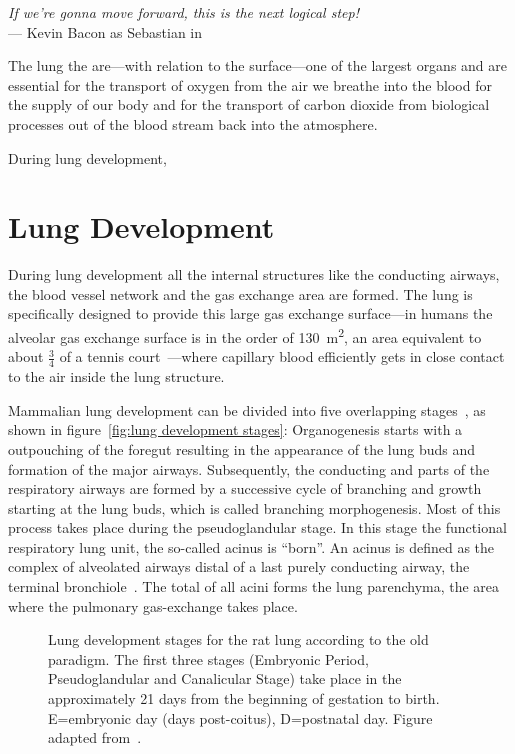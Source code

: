 \label{ch:lung}
\begin{flushright}{\slshape If we're gonna move forward, this is the next logical step!} \\ \medskip
	--- Kevin Bacon as Sebastian in \citep{HollowMan}
\end{flushright}
\vspace{52mm}

The lung the are---with relation to the surface---one of the largest organs  and are essential for the transport of oxygen from the air we breathe into the blood for the supply of our body and for the transport of carbon dioxide from biological processes out of the blood stream back into the atmosphere.

During lung development, 

\section{Lung Development}
During lung development all the internal structures like the conducting airways, the blood vessel network and the gas exchange area are formed. The lung is specifically designed to provide this large gas exchange surface---in humans the alveolar gas exchange surface is in the order of \SI{130}{\meter\squared}, an area equivalent to about $\frac{3}{4}$ of a tennis court~\cite{Weibel2009}---where capillary blood efficiently gets in close contact to the air inside the lung structure. 

Mammalian lung development can be divided into five overlapping stages~\cite{Schittny2004,Schittny2007a}, as shown in figure~\ref{fig:lung development stages}: Organogenesis starts with a outpouching of the foregut resulting in the appearance of the lung buds and formation of the major airways. Subsequently, the conducting and parts of the respiratory airways are formed by a successive cycle of branching and growth starting at the lung buds, which is called branching morphogenesis. Most of this process takes place during the pseudoglandular stage. In this stage the functional respiratory lung unit, the so-called acinus is ``born''. An acinus is defined as the complex of alveolated airways distal of a last purely conducting airway, the terminal bronchiole~\cite{Rodriguez1987}. The total of all acini forms the lung parenchyma, the area where the pulmonary gas-exchange takes place.

\begin{figure}[htb]
	\noindent\makebox[\textwidth]{%
		\centering%
		}%
	\caption[Lung development stages]{Lung development stages for the rat lung according to the old paradigm. The first three stages (Embryonic Period, Pseudoglandular and Canalicular Stage) take place in the approximately 21 days from the beginning of gestation to birth. E=embryonic day (days post-coitus), D=postnatal day. Figure adapted from~\cite{Schittny2007a}.}
	\label{fig:lung development stages old}
\end{figure}


